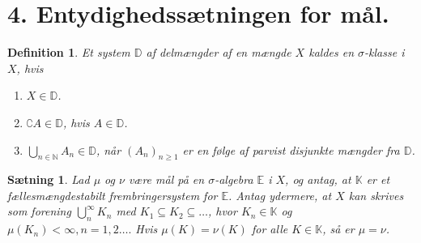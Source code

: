 \documentclass[12pt]{report}
\newtheorem{theorem}[lemma]{Sætning}
\newtheorem{definition}[lemma]{Definition}
\theoremstyle{break}
\theoremstyle{break}
\newcommand{\EE}{\mathbb{E}}
\newcommand{\K}{\mathbb{K}}
\newcommand{\D}{\mathbb{D}}
\begin{document}
\newpage
\section*{4. Entydighedssætningen for mål.}
\begin{definition}
Et system $\D$ af delmængder af en mængde $X$ kaldes en $\sigma$-klasse i $X$, hvis
\begin{enumerate}
\item $X\in\D$.
\item $\complement A\in\D$, hvis $A\in\D$.
\item $\bigcup_{n\in\mathbb{N}}A_n\in\D$, når $(A_n)_{n\geq 1}$ er en følge af parvist disjunkte mængder fra $\D$.
\end{enumerate}
\end{definition}
\begin{theorem}
Lad $\mu$ og $\nu$ være mål på en $\sigma$-algebra $\EE$ i $X$, og antag, at $\K$ er et fællesmængdestabilt frembringersystem for $\EE$.  Antag ydermere, at $X$ kan skrives som forening $\bigcup^\infty_nK_n$ med $K_1\subseteq K_2\subseteq\ldots$, hvor $K_n\in\K$ og $\mu(K_n)<\infty, n=1,2\ldots.$ Hvis $\mu(K)=\nu(K)$ for alle $K\in\K$, så er $\mu=\nu$.
\end{theorem}
\end{document}
